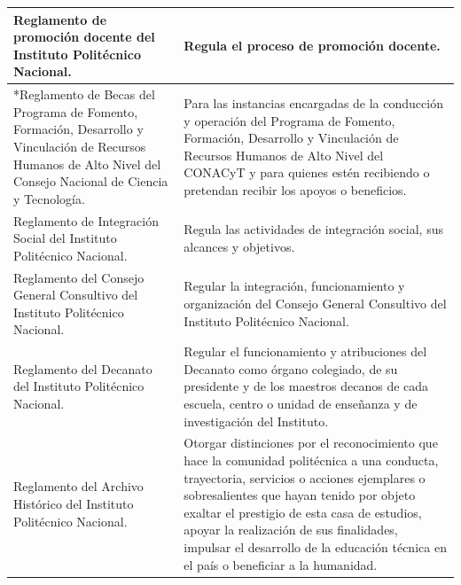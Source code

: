 \begin{tabular}{ | m{17em} | m{25em}|}
    \hline
    Reglamento de promoción docente del Instituto Politécnico Nacional. & Regula el proceso de promoción docente. \\
    \hline
    *Reglamento de Becas del Programa de Fomento, Formación, Desarrollo y Vinculación de Recursos Humanos de Alto Nivel del Consejo Nacional de Ciencia y Tecnología. &  Para las instancias encargadas de la conducción y operación del Programa  de Fomento, Formación, Desarrollo y Vinculación de Recursos Humanos de Alto Nivel del CONACyT y para quienes estén recibiendo o pretendan recibir los apoyos o beneficios. \\
    \hline
    Reglamento de Integración Social del Instituto Politécnico Nacional. & Regula las actividades de integración social, sus alcances y objetivos. \\
    \hline
    Reglamento del Consejo General Consultivo del Instituto Politécnico Nacional. & Regular la integración, funcionamiento y organización del Consejo General Consultivo del Instituto Politécnico Nacional. \\
    \hline
    Reglamento del Decanato del Instituto Politécnico Nacional. & Regular el funcionamiento y atribuciones del Decanato como órgano colegiado, de su presidente y de los maestros decanos de cada escuela, centro o unidad de enseñanza y de investigación del Instituto. \\
    \hline
    Reglamento del Archivo Histórico del Instituto Politécnico Nacional. & Otorgar distinciones por el reconocimiento que hace la comunidad politécnica a una conducta, trayectoria, servicios o acciones ejemplares o sobresalientes que hayan tenido por objeto exaltar el prestigio de esta casa de estudios, apoyar la realización de sus finalidades, impulsar el desarrollo de la educación técnica en el país o beneficiar a la humanidad. \\
    \hline
    
\end{tabular}

